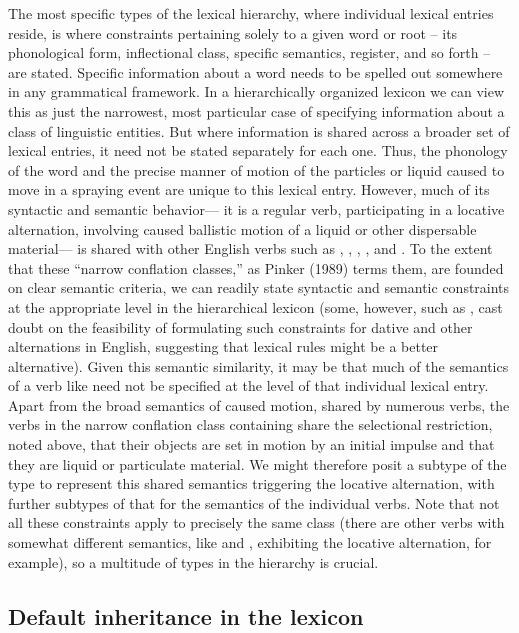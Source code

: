 \documentclass[output=paper]{langsci/langscibook}
\begin{document}
The most specific types of the lexical hierarchy, where individual lexical entries reside, is where constraints pertaining solely to a given word or root -- its phonological form, inflectional class, specific semantics, register, and so forth -- are stated.
Specific information about a word needs to be spelled out somewhere in any grammatical framework.
In a hierarchically organized lexicon we can view this as just the narrowest, most particular case of specifying information about a class of linguistic entities.
But where information is shared across a broader set of lexical entries, it need not be stated separately for each one.
Thus, the phonology of the word  and the precise manner of motion of the particles or liquid caused to move in a spraying event are unique to this lexical entry.
However, much of its syntactic and semantic behavior--- it is a regular verb,  participating in a locative alternation, involving caused ballistic motion of a liquid or other dispersable material--- is shared with other English verbs such as , , , , and .
To the extent that these ``narrow conflation classes,'' as Pinker (1989) terms them, are founded on clear semantic criteria, we can readily state syntactic and semantic constraints at the appropriate level in the hierarchical lexicon (some, however, such as \citet{BriscoeandCopestake1999}, cast doubt on the feasibility of formulating such constraints for dative and other alternations in English, suggesting that lexical rules might be a better alternative).
Given this semantic similarity, it may be that much of the semantics of a verb like  need not be specified at the level of that individual lexical entry.
Apart from the broad semantics of caused motion, shared by numerous verbs, the verbs in the narrow conflation class containing  share the selectional restriction, noted above, that their objects are set in motion by an initial impulse and that they are liquid or particulate material.
We might therefore posit a subtype of the type  to represent this shared semantics triggering the locative alternation, with further subtypes of that for the semantics of the individual verbs.
Note that not all these constraints apply to precisely the same class (there are other verbs with somewhat different semantics, like  and , exhibiting the locative alternation, for example), so a multitude of types in the hierarchy is crucial.


\subsection{Default inheritance in the lexicon}
\end{document}
